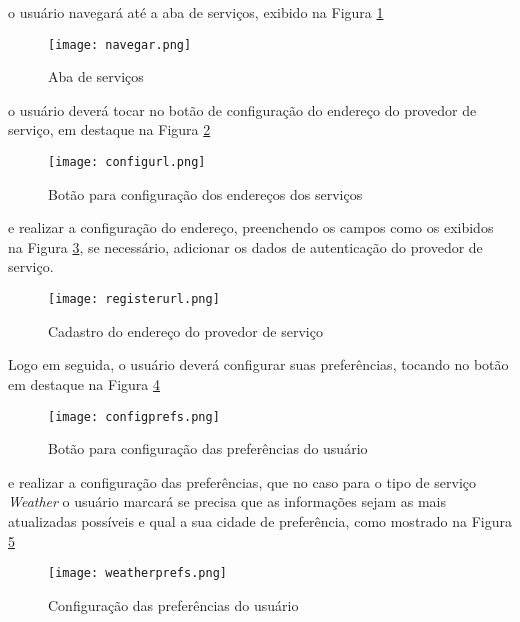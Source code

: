 o usuário navegará até a aba de serviços, exibido na Figura \ref{fig:navegar}

\begin{figure}[!htb]
  \centering
  \texttt{[image: navegar.png]} %
  \caption[Aba de serviços]{Aba de serviços}
  \label{fig:navegar}
\end{figure}

o usuário deverá tocar no botão de configuração do endereço do provedor de serviço, em destaque na Figura \ref{fig:configurl}

\begin{figure}[!htb]
  \centering
  \texttt{[image: configurl.png]} %
  \caption[Botão para configuração dos endereços dos serviços]{Botão para configuração dos endereços dos serviços}
  \label{fig:configurl}
\end{figure}

e realizar a configuração do endereço, preenchendo os campos como os exibidos na Figura \ref{fig:registerurl}, se necessário, adicionar os dados de autenticação do provedor de serviço.

\begin{figure}[!htb]
  \centering
  \texttt{[image: registerurl.png]} %
  \caption[Cadastro do endereço do provedor de serviço]{Cadastro do endereço do provedor de serviço}
  \label{fig:registerurl}
\end{figure}

Logo em seguida, o usuário deverá configurar suas preferências, tocando no botão em destaque na Figura \ref{fig:configprefs}

\begin{figure}[!htb]
  \centering
  \texttt{[image: configprefs.png]} %
  \caption[Botão para configuração das preferências do usuário]{Botão para configuração das preferências do usuário}
  \label{fig:configprefs}
\end{figure}

e realizar a configuração das preferências, que no caso para o tipo de serviço \textit{Weather} o usuário marcará se precisa que as informações sejam as mais atualizadas possíveis e qual a sua cidade de preferência, como mostrado na Figura \ref{fig:weatherprefs}

\begin{figure}[!htb]
  \centering
  \texttt{[image: weatherprefs.png]} %
  \caption[Configuração das preferências do usuário]{Configuração das preferências do usuário}
  \label{fig:weatherprefs}
\end{figure}

